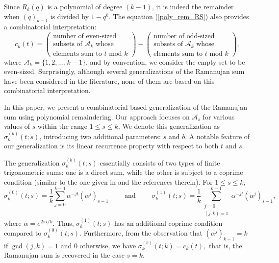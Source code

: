 \documentclass[12pt]{article}
\begin{document}
Since $R_{k}(q)$ is a polynomial of degree $(k-1)$, it is indeed the remainder when $(q)_{k-1}$ is divided by $1-q^{k}$. The equation (\ref{poly_rem_RS}) also provides a combinatorial interpretation:
\begin{equation}\label{RS_Comb}
c_{k}(t) = \left(\begin{matrix}
    \text{number of even-sized} \\
    \text{subsets of } \mathcal{A}_{k} \text{ whose} \\
    \text{elements sum to } t \text{ mod } k
\end{matrix}\right) - \left(\begin{matrix}
    \text{number of odd-sized} \\
    \text{subsets of } \mathcal{A}_{k} \text{ whose} \\
    \text{elements sum to } t \text{ mod } k
\end{matrix}\right),
\end{equation}
where $\mathcal{A}_{k} = \{1, 2, \ldots, k-1\}$, and by convention, we consider the empty set to be even-sized. Surprisingly, although several generalizations of the Ramanujan sum have been considered in the literature, none of them are based on this combinatorial interpretation. 

In this paper, we present a combinatorial-based generalization of the Ramanujan sum using polynomial remaindering. Our approach focuses on $\mathcal{A}_{s}$ for various values of $s$ within the range $1 \leq s \leq k$. We denote this generalization as $\sigma^{(b)}_{k}(t;s)$, introducing two additional parameters: $s$ and $b$. A notable feature of our generalization is its linear recurrence property with respect to both $t$ and $s$.

The generalization \(\sigma^{(b)}_{k}(t;s)\) essentially consists of two types of finite trigonometric sums: one is a direct sum, while the other is subject to a coprime condition (similar to the one given in \cite{bruce} and the references therein). For \(1 \leq s \leq k\),
\[
\sigma^{(0)}_{k}(t;s) = \frac{1}{k}\sum_{j=0}^{k-1}\alpha^{-jt}(\alpha^{j})_{s-1} \quad \quad \text{ and } \quad \quad \sigma^{(1)}_{k}(t;s) = \frac{1}{k}\sum_{\substack{j=0 \\ (j,k)=1}}^{k-1}\alpha^{-jt}(\alpha^{j})_{s-1},
\]
where \(\alpha = e^{2\pi i/k}\). Thus, \(\sigma^{(1)}_{k}(t;s)\) has an additional coprime condition compared to \(\sigma^{(0)}_{k}(t;s)\). Furthermore, from the observation that \((\alpha^{j})_{k-1}=k\) if \(\gcd(j,k)=1\) and \(0\) otherwise, we have 
$
\sigma_{k}^{(b)}(t;k)=c_{k}(t),
$ that is, the Ramanujan sum is recovered in the case $s=k$.
\end{document}
